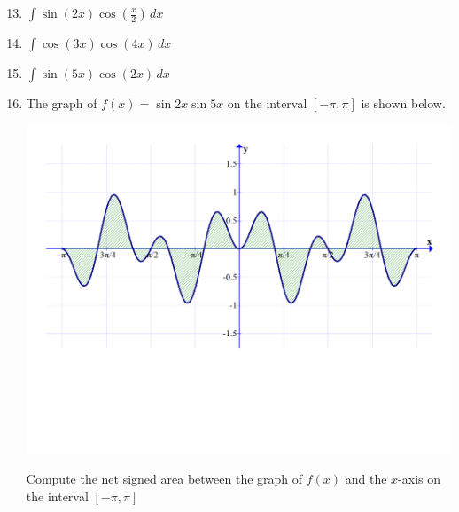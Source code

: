 \documentclass[12pt]{article}
\newif\ifans
\begin{document}
\begin{enumerate}
\setcounter{enumi}{12}

\item $\int \sin{(2x)}\cos{\left(\frac{x}{2}\right)}\,dx$ 

\ifans{\fbox{$-\frac{1}{5}\cos{\left(\frac{5x}{2}\right)}-\frac{1}{3}\cos{\left(\frac{3x}{2}\right)}+C$}} \fi

\item $\int \cos{(3x)}\cos{(4x)}\,dx$ 

\ifans{\fbox{$\frac{1}{2}\sin{x}+\frac{1}{14}\sin{(7x)}+C$}} \fi

\item $\int \sin{(5x)}\cos{(2x)}\,dx$ 

\ifans{\fbox{$-\frac{1}{6}\cos{(3x)}-\frac{1}{14}\cos{(7x)}+C$}} \fi

\newpage

\item The graph of $f(x)=\sin{2x}\sin{5x}$ on the interval $[-\pi,\pi]$ is shown below.

\begin{center}
\includegraphics[scale=0.3]{graph.pdf}
\end{center}

Compute the net signed area between the graph of $f(x)$ and the $x$-axis on the interval $[-\pi,\pi]$

\ifans{\fbox{0}} \fi

\end{enumerate}

\end{document}
